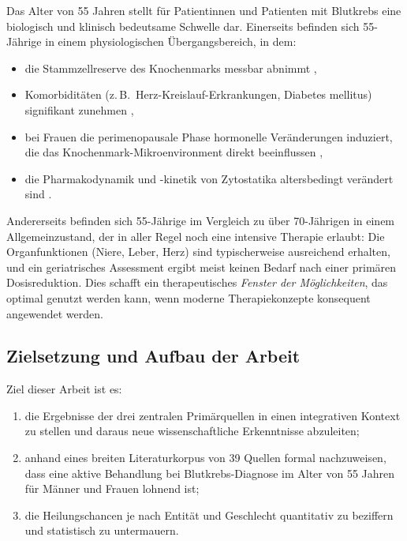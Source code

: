﻿\documentclass[12pt,a4paper]{article}
\theoremstyle{definition}
\begin{document}
Das Alter von 55 Jahren stellt für Patientinnen und Patienten mit Blutkrebs eine
biologisch und klinisch bedeutsame Schwelle dar. Einerseits befinden sich 55-Jährige
in einem physiologischen Übergangsbereich, in dem:
\begin{itemize}
  \item die Stammzellreserve des Knochenmarks messbar abnimmt \cite{appelbaum2006},
  \item Komorbiditäten (z.\,B.\ Herz-Kreislauf-Erkrankungen, Diabetes mellitus)
        signifikant zunehmen \cite{extermann2007},
  \item bei Frauen die perimenopausale Phase hormonelle Veränderungen induziert,
        die das Knochenmark-Mikroenvironment direkt beeinflussen
        \cite{cook2009,micheli2009},
  \item die Pharmakodynamik und -kinetik von Zytostatika altersbedingt verändert
        sind \cite{frey2010}.
\end{itemize}

Andererseits befinden sich 55-Jährige im Vergleich zu über 70-Jährigen in einem
Allgemeinzustand, der in aller Regel noch eine intensive Therapie erlaubt: Die
Organfunktionen (Niere, Leber, Herz) sind typischerweise ausreichend erhalten, und
ein geriatrisches Assessment \cite{wildiers2014} ergibt meist keinen Bedarf nach
einer primären Dosisreduktion. Dies schafft ein therapeutisches \emph{Fenster der
Möglichkeiten}, das optimal genutzt werden kann, wenn moderne Therapiekonzepte
konsequent angewendet werden.

\subsection{Zielsetzung und Aufbau der Arbeit}

Ziel dieser Arbeit ist es:
\begin{enumerate}
  \item die Ergebnisse der drei zentralen Primärquellen
        \cite{adeyemi2025,wong2016,mccabe2015} in einen integrativen Kontext zu
        stellen und daraus neue wissenschaftliche Erkenntnisse abzuleiten;
  \item anhand eines breiten Literaturkorpus von 39 Quellen formal nachzuweisen,
        dass eine aktive Behandlung bei Blutkrebs-Diagnose im Alter von 55 Jahren
        für Männer und Frauen lohnend ist;
  \item die Heilungschancen je nach Entität und Geschlecht quantitativ zu
        beziffern und statistisch zu untermauern.
\end{enumerate}
\end{document}
